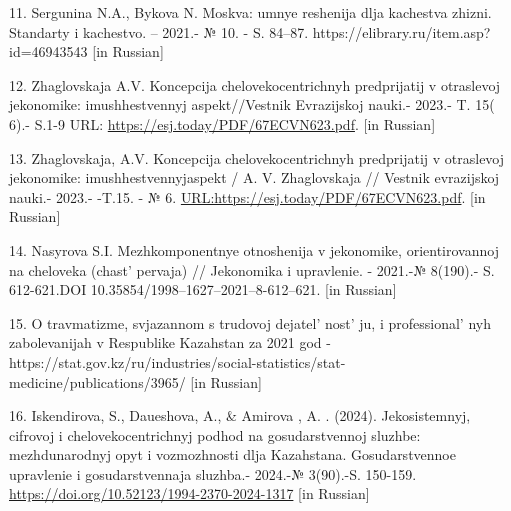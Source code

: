 \begin{references}
11. Sergunina N.A., Bykova N. Moskva: umnye reshenija dlja kachestva
zhizni. Standarty i kachestvo. -- 2021.- № 10. - S. 84--87.
https://elibrary.ru/item.asp?id=46943543 {[}in Russian{]}

12. Zhaglovskaja A.V. Koncepcija chelovekocentrichnyh predprijatij v
otraslevoj jekonomike: imushhestvennyj aspekt//Vestnik Evrazijskoj
nauki.- 2023.- T. 15( 6).- S.1-9 URL:
\url{https://esj.today/PDF/67ECVN623.pdf}. {[}in Russian{]}

13. Zhaglovskaja, A.V. Koncepcija chelovekocentrichnyh predprijatij v
otraslevoj jekonomike: imushhestvennyjaspekt / A. V. Zhaglovskaja //
Vestnik evrazijskoj nauki.- 2023.- -T.15. - № 6.
\url{URL:https://esj.today/PDF/67ECVN623.pdf}. {[}in Russian{]}

14. Nasyrova S.I. Mezhkomponentnye otnoshenija v jekonomike,
orientirovannoj na cheloveka (chast'{} pervaja) //
Jekonomika i upravlenie. - 2021.-№ 8(190).- S. 612-621.DOI
10.35854/1998--1627--2021--8-612--621. {[}in Russian{]}

15. O travmatizme, svjazannom s trudovoj
dejatel' nost' ju, i
professional' nyh zabolevanijah v Respublike Kazahstan za
2021 god -
https://stat.gov.kz/ru/industries/social-statistics/stat-medicine/publications/3965/
{[}in Russian{]}

16. Iskendirova, S., Daueshova, A., \& Amirova , A. . (2024).
Jekosistemnyj, cifrovoj i chelovekocentrichnyj podhod na gosudarstvennoj
sluzhbe: mezhdunarodnyj opyt i vozmozhnosti dlja Kazahstana.
Gosudarstvennoe upravlenie i gosudarstvennaja sluzhba.- 2024.-№
3(90).-S. 150-159. \url{https://doi.org/10.52123/1994-2370-2024-1317}
{[}in Russian{]}
\end{references}
